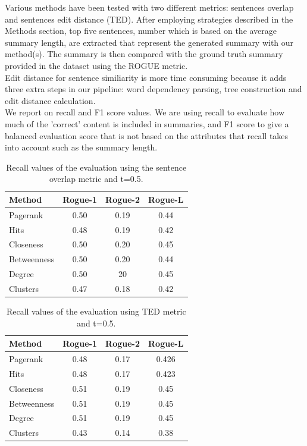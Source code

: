 \documentclass[9pt,twocolumn,twoside]{pnas-report}
\begin{document}
Various methods have been tested with two different metrics: sentences overlap and sentences edit distance (TED). After employing strategies described in the Methods section, top five sentences, number which is based on the average summary length, are extracted that represent the generated summary with our method(s). The summary is then compared with the ground truth summary provided in the dataset using the ROGUE metric. \\
Edit distance for sentence similiarity is more time consuming because it adds three extra steps in our pipeline: word dependency parsing, tree construction and edit distance calculation. \\
We report on recall and F1 score values. We are using recall to evaluate how much of the 'correct' content is included in summaries, and F1 score to give a balanced evaluation score that is not based on the attributes that recall takes into account such as the summary length. 
\begin{table}[t]\centering%
	\caption{Recall values of the evaluation using the sentence overlap metric and t=0.5.}
	\begin{tabular}{lccc}\toprule
	   	\textbf{Method} & \textbf{Rogue-1} & \textbf{Rogue-2} & \textbf{Rogue-L}\\
		\midrule
		Pagerank & 0.50 & 0.19 & 0.44 \\
		\midrule
		Hits & 0.48 & 0.19 & 0.42 \\
		\midrule
		Closeness & 0.50 & 0.20 & 0.45 \\ 
		\midrule
		Betweenness & 0.50 & 0.20 & 0.44 \\
		\midrule
		Degree & 0.50 & 20 & 0.45 \\
		\midrule
		Clusters & 0.47 & 0.18 & 0.42 \\
		\bottomrule

	\end{tabular}
	\label{tbl:metric_1}
\end{table}

\begin{table}[t]\centering%
	\caption{Recall values of the evaluation using TED metric and t=0.5.}
	\begin{tabular}{lccc}\toprule
	   	\textbf{Method} & \textbf{Rogue-1} & \textbf{Rogue-2} & \textbf{Rogue-L}\\
		\midrule
		Pagerank & 0.48 & 0.17 & 0.426 \\
		\midrule
		Hits & 0.48 & 0.17 & 0.423 \\
		\midrule
		Closeness & 0.51 & 0.19 & 0.45 \\ 
		\midrule
		Betweenness & 0.51 & 0.19 & 0.45 \\
		\midrule
		Degree & 0.51 & 0.19 & 0.45 \\
		\midrule
		Clusters & 0.43 & 0.14 & 0.38 \\
		\bottomrule

	\end{tabular}
	\label{tbl:metric_2}
\end{table}
\end{document}
